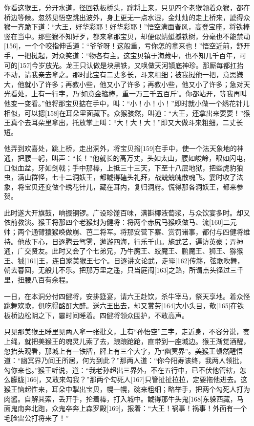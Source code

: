 \documentclass[12pt,UTF8]{ctexbook}
\begin{document}
你看这猴王，分开水道，径回铁板桥头，蹿将上来，只见四个老猴领着众猴，都在桥边等候。忽然见悟空跳出波外，身上更无一点水湿，金灿灿的走上桥来，諕得众猴一齐跪下道：“大王，好华彩耶！好华彩耶！”悟空满面春风，高登宝座，将铁棒竖在当中。那些猴不知好歹，都来拿那宝贝，却便似蜻蜓撼铁树，分毫也不能禁动[156]，一个个咬指伸舌道：“爷爷呀！这般重，亏你怎的拿来也！”悟空近前，舒开手，一把挝起，对众笑道：“物各有主。这宝贝镇于海藏中，也不知几千百年，可可的[157]今岁放光。龙王只认做是块黑铁，又唤做天河镇底神珍。那厮每都扛抬不动，请我亲去拿之。那时此宝有二丈多长，斗来粗细；被我挝他一把，意思嫌大，他就小了许多；再教小些，他又小了许多；再教小些，他又小了许多；急对天光看处，上有一行字，乃‘如意金箍棒，重一万三千五百斤’。你都站开，等我再叫他变一变看。”他将那宝贝掂在手中，叫：“小！小！小！”即时就小做一个绣花针儿相似，可以揌[158]在耳朵里面藏下。众猴骇然，叫道：“大王，还拿出来耍耍！”猴王真个去耳朵里拿出，托放掌上叫：“大！大！大！”即又大做斗来粗细，二丈长短。

他弄到欢喜处，跳上桥，走出洞外，将宝贝揝[159]在手中，使一个法天象地的神通，把腰一躬，叫声：“长！”他就长的高万丈，头如太山，腰如峻岭，眼如闪电，口似血盆，牙如剑戟；手中那棒，上抵三十三天，下至十八层地狱，把些虎豹狼虫，满山群怪，七十二洞妖王，都諕得磕头礼拜，战兢兢魄散魂飞。霎时收了法象，将宝贝还变做个绣花针儿，藏在耳内，复归洞府。慌得那各洞妖王，都来参贺。

此时遂大开旗鼓，响振铜锣。广设珍馐百味，满斟椰液萄浆，与众饮宴多时。却又依前教演。猴王将那四个老猴封为健将：将两个赤尻马猴唤做马、流[160]二元帅；两个通臂猿猴唤做崩、芭二将军。将那安营下寨、赏罚诸事，都付与四健将维持。他放下心，日逐腾云驾雾，遨游四海，行乐千山。施武艺，遍访英豪；弄神通，广交贤友。此时又会了个七弟兄，乃牛魔王、蛟魔王、鹏魔王、狮王、猕猴王、狨[161]王，连自家美猴王七个。日逐讲文论武，走斝[162]传觞，弦歌吹舞，朝去暮回，无般儿不乐。把那万里之遥，只当庭闱[163]之路，所谓点头径过三千里，扭腰八百有余程。

一日，在本洞分付四健将，安排筵宴，请六王赴饮，杀牛宰马，祭天享地。着众怪跳舞欢歌，俱吃得酩酊大醉。送六王出去，却又赏劳[164]大小头目，欹[165]在铁板桥边松阴之下，霎时间睡着。四健将领众围护，不敢高声。

只见那美猴王睡里见两人拿一张批文，上有“孙悟空”三字，走近身，不容分说，套上绳，就把美猴王的魂灵儿索了去，踉踉跄跄，直带到一座城边。猴王渐觉酒醒，忽抬头观看，那城上有一铁牌，牌上有三个大字，乃“幽冥界”。美猴王顿然醒悟道：“幽冥界乃阎王所居，何为到此？”那两人道：“你今阳寿该终，我两人领批，勾你来也。”猴王听说，道：“我老孙超出三界外，不在五行中，已不伏他管辖，怎么朦胧[166]，又敢来勾我？”那两个勾死人[167]只管扯扯拉拉，定要拖他进去。这猴王恼起性来，耳朵中掣出宝贝，幌一幌，碗来粗细；略举手，把两个勾死人打为肉酱。自解其索，丢开手，抡着棒，打入城中。諕得那牛头鬼[168]东躲西藏，马面鬼南奔北跑，众鬼卒奔上森罗殿[169]，报着：“大王！祸事！祸事！外面有一个毛脸雷公打将来了！”
\end{document}
